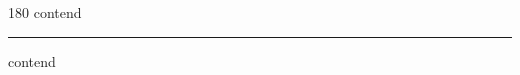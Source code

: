 
\begin{frame}
\begin{center}
\begin{turn}{180}
{\fontsize{2.5cm}{1em}\selectfont contend}
\end{turn}
\vspace{1em}\par  
\hrule
\vspace{1em}\par  
{\fontsize{2.5cm}{1em}\selectfont contend}
\end{center}
\end{frame}
